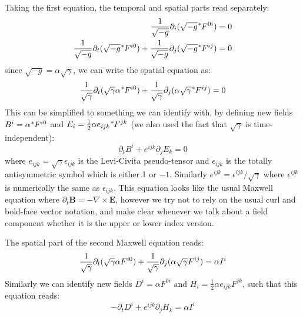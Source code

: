 Taking the first equation, the temporal and spatial parts read separately:
\begin{align}
  \frac{1}{\sqrt{-g}}\partial_i(\sqrt{-g}\tensor[^{*}]{F}{^{0i}}) &= 0 \\
  \frac{1}{\sqrt{-g}}\partial_t(\sqrt{-g}\tensor[^{*}]{F}{^{i0}}) + \frac{1}{\sqrt{-g}}\partial_j(\sqrt{-g}\tensor[^{*}]{F}{^{ij}}) &= 0
\end{align}
since $\sqrt{-g} = \alpha\sqrt{\gamma}$, we can write the spatial equation as:
\begin{equation}
  \label{eq:10}
  \frac{1}{\sqrt{\gamma}}\partial_t(\sqrt{\gamma}\alpha\tensor[^{*}]{F}{^{i0}}) + \frac{1}{\sqrt{\gamma}}\partial_j(\alpha\sqrt{\gamma}\tensor[^{*}]{F}{^{ij}}) = 0
\end{equation}
This can be simplified to something we can identify with, by defining new fields
$B^i = \alpha\tensor[^{*}]{F}{^{i0}}$ and $E_i = \frac{1}{2}\alpha
e_{ijk}\tensor[^{*}]{F}{^{jk}}$ (we also used the fact that $\sqrt{\gamma}$ is time-independent):
\begin{equation}
  \label{eq:11}
  \partial_tB^i + e^{ijk}\partial_jE_k = 0
\end{equation}
where $e_{ijk} = \sqrt{\gamma}\epsilon_{ijk}$ is the Levi-Civita pseudo-tensor
and $\epsilon_{ijk}$ is the totally antisymmetric symbol which is either 1 or
$-1$. Similarly $e^{ijk} = \epsilon^{ijk}/\sqrt{\gamma}$ where $\epsilon^{ijk}$
is numerically the same as $\epsilon_{ijk}$. This equation looks like the usual
Maxwell equation where $\partial_t\mathbf{B} = -\nabla\times \mathbf{E}$,
however we try not to rely on the usual curl and bold-face vector notation, and
make clear whenever we talk about a field component whether it is the upper or
lower index version.

The spatial part of the second Maxwell equation reads:
\begin{equation}
  \label{eq:14}
  \frac{1}{\sqrt{\gamma}}\partial_t(\sqrt{\gamma}\alpha\tensor{F}{^{i0}}) + \frac{1}{\sqrt{\gamma}}\partial_j(\alpha\sqrt{\gamma}\tensor{F}{^{ij}}) = \alpha I^{i}
\end{equation}
Similarly we can identify new fields $D^i = \alpha F^{0i}$ and $H_i =
\frac{1}{2}\alpha e_{ijk}F^{jk}$, such that this equation reads:
\begin{equation}
  \label{eq:15}
  -\partial_tD^i + e^{ijk}\partial_jH_k = \alpha I^i
\end{equation}


